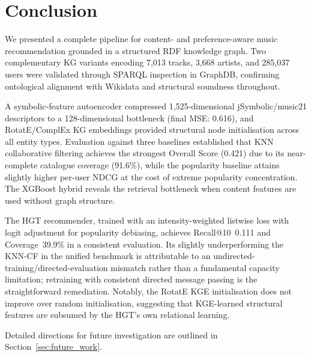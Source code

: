 \section{Conclusion}
\label{sec:conclusion}

We presented a complete pipeline for content- and preference-aware music recommendation grounded in a structured RDF knowledge graph. Two complementary KG variants encoding 7,013 tracks, 3,668 artists, and 285,037 users were validated through SPARQL inspection in GraphDB, confirming ontological alignment with Wikidata and structural soundness throughout.

A symbolic-feature autoencoder compressed 1,525-dimensional jSymbolic/music21 descriptors to a 128-dimensional bottleneck (final MSE: 0.616), and RotatE/ComplEx KG embeddings provided structural node initialisation across all entity types. Evaluation against three baselines established that KNN collaborative filtering achieves the strongest Overall Score (0.421) due to its near-complete catalogue coverage (91.6\%), while the popularity baseline attains slightly higher per-user NDCG at the cost of extreme popularity concentration. The XGBoost hybrid reveals the retrieval bottleneck when content features are used without graph structure.

The HGT recommender, trained with an intensity-weighted listwise loss with logit adjustment for popularity debiasing, achieves Recall@10~0.111 and Coverage~39.9\% in a consistent evaluation. Its slightly underperforming the KNN-CF in the unified benchmark is attributable to an undirected-training/directed-evaluation mismatch rather than a fundamental capacity limitation; retraining with consistent directed message passing is the straightforward remediation. Notably, the RotatE KGE initialisation does not improve over random initialisation, suggesting that KGE-learned structural features are subsumed by the HGT's own relational learning.

Detailed directions for future investigation are outlined in Section~\ref{sec:future_work}.
